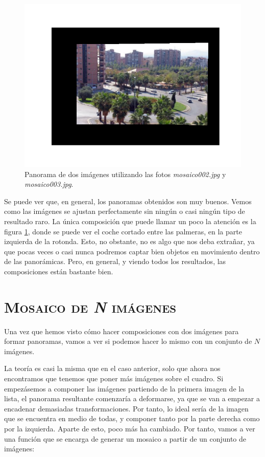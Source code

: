 \documentclass[11pt,a4paper]{article}
\begin{document}
\begin{figure}[H]
	\centering
	\includegraphics[scale=0.7]{img/pano2-3}
	\caption{Panorama de dos imágenes utilizando las fotos \textit{mosaico002.jpg} y \textit{mosaico003.jpg}.}
	\label{fig:pano-etsiit23}
\end{figure}

Se puede ver que, en general, los panoramas obtenidos son muy buenos. Vemos como
las imágenes se ajustan perfectamente sin ningún o casi ningún tipo de resultado raro. La única
composición que puede llamar un poco la atención es la figura \ref{fig:pano-etsiit23}, donde se puede
ver el coche cortado entre las palmeras, en la parte izquierda de la rotonda. Esto, no obstante, no es
algo que nos deba extrañar, ya que pocas veces o casi nunca podremos captar bien objetos
en movimiento dentro de las panorámicas. Pero, en general, y viendo todos los resultados,
las composiciones están bastante bien.

\section{\textsc{Mosaico de \textit{N} imágenes}}

Una vez que hemos visto cómo hacer composiciones con dos imágenes para formar panoramas,
vamos a ver si podemos hacer lo mismo con un conjunto de $N$ imágenes.

La teoría es casi la misma que en el caso anterior, solo que ahora nos encontramos que tenemos
que poner más imágenes sobre el cuadro. Si empezásemos a componer las imágenes partiendo
de la primera imagen de la lista, el panorama resultante comenzaría a deformarse, ya que se van
a empezar a encadenar demasiadas transformaciones. Por tanto, lo ideal sería de la imagen que
se encuentra en medio de todas, y componer tanto por la parte derecha como por la izquierda.
Aparte de esto, poco más ha cambiado. Por tanto, vamos a ver una función que se encarga de
generar un mosaico a partir de un conjunto de imágenes:
\end{document}
